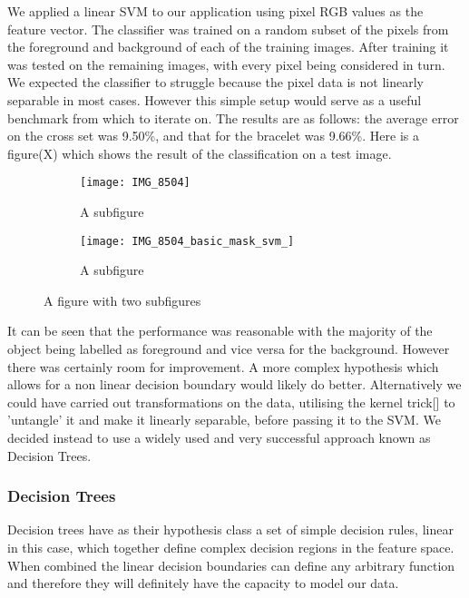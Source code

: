 \documentclass[12pt]{IIBproject}
\begin{document}
We applied a linear SVM to our application using pixel RGB values as the feature vector. The classifier was trained on a random subset of the pixels from the foreground and background of each of the training images. After training it was tested on the remaining images, with every pixel being considered in turn. We expected the classifier to struggle because the pixel data is not linearly separable in most cases.  However this simple setup would serve as a useful benchmark from which to iterate on. The results are as follows: the average error on the cross set was 9.50\%, and that for the bracelet was 9.66\%. Here is a figure(X) which shows the result of the classification on a test image. 
\begin{figure}[H]
\centering
\begin{subfigure}{.5\textwidth}
  \centering
  \texttt{[image: IMG\_8504]}
  \caption{A subfigure}
  \label{fig:sub1}
\end{subfigure}%
\begin{subfigure}{.5\textwidth}
  \centering
  \texttt{[image: IMG\_8504\_basic\_mask\_svm\_]}
  \caption{A subfigure}
  \label{fig:sub2}
\end{subfigure}
\caption{A figure with two subfigures}
\label{fig:test}
\end{figure}

It can be seen that the performance was reasonable with the majority of the object being labelled as foreground and vice versa for the background. However there was certainly room for improvement. A more complex hypothesis which allows for a non linear decision boundary would likely do better. Alternatively we could have carried out transformations on the data, utilising the kernel trick[] to 'untangle' it and make it linearly separable, before passing it to the SVM. We decided instead to use a widely used and very successful approach known as Decision Trees.
\subsubsection{Decision Trees}

Decision trees have as their hypothesis class a set of simple decision rules, linear in this case, which together define complex decision regions in the feature space.  When combined the linear decision boundaries can define any arbitrary function and therefore they will definitely have the capacity to model our data. 
\end{document}
